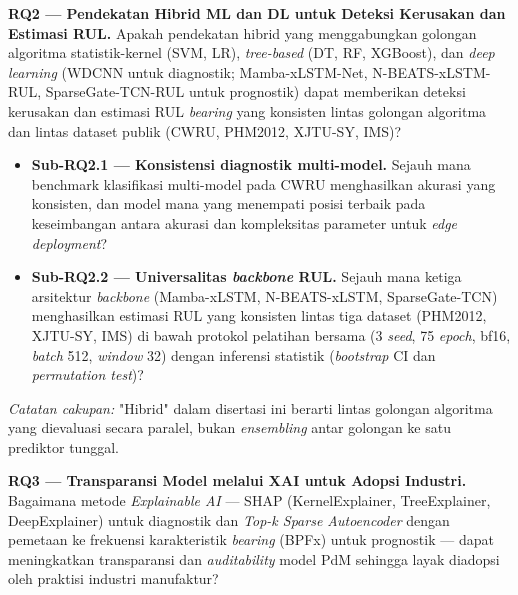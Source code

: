 \textbf{RQ2 --- Pendekatan Hibrid ML dan DL untuk Deteksi Kerusakan
dan Estimasi RUL.}
Apakah pendekatan hibrid yang menggabungkan golongan algoritma
statistik-kernel (SVM, LR), \emph{tree-based} (DT, RF, XGBoost),
dan \emph{deep learning} (WDCNN untuk diagnostik; Mamba-xLSTM-Net,
N-BEATS-xLSTM-RUL, SparseGate-TCN-RUL untuk prognostik) dapat
memberikan deteksi kerusakan dan estimasi RUL \emph{bearing} yang konsisten
lintas golongan algoritma dan lintas dataset publik (CWRU, PHM2012,
XJTU-SY, IMS)?

\begin{itemize}
  \item \textbf{Sub-RQ2.1 — Konsistensi diagnostik multi-model.}
        Sejauh mana benchmark klasifikasi multi-model pada CWRU
        menghasilkan akurasi yang konsisten, dan model mana yang
        menempati posisi terbaik pada keseimbangan antara akurasi
        dan kompleksitas parameter untuk \emph{edge deployment}?
  \item \textbf{Sub-RQ2.2 — Universalitas \emph{backbone} RUL.}
        Sejauh mana ketiga arsitektur \emph{backbone} (Mamba-xLSTM,
        N-BEATS-xLSTM, SparseGate-TCN) menghasilkan estimasi RUL
        yang konsisten lintas tiga dataset (PHM2012, XJTU-SY, IMS)
        di bawah protokol pelatihan bersama (3 \emph{seed}, 75
        \emph{epoch}, bf16, \emph{batch} 512, \emph{window} 32)
        dengan inferensi statistik (\emph{bootstrap} CI dan
        \emph{permutation test})?
\end{itemize}

\noindent\textit{Catatan cakupan:} "Hibrid" dalam disertasi ini
berarti lintas golongan algoritma yang dievaluasi secara paralel,
bukan \emph{ensembling} antar golongan ke satu prediktor tunggal.

\medskip

\textbf{RQ3 --- Transparansi Model melalui XAI untuk Adopsi Industri.}
Bagaimana metode \emph{Explainable AI} --- SHAP (KernelExplainer,
TreeExplainer, DeepExplainer) untuk diagnostik dan \emph{Top-k Sparse
Autoencoder} dengan pemetaan ke frekuensi karakteristik \emph{bearing} (BPFx)
untuk prognostik --- dapat meningkatkan transparansi dan
\emph{auditability} model PdM sehingga layak diadopsi oleh praktisi
industri manufaktur?


